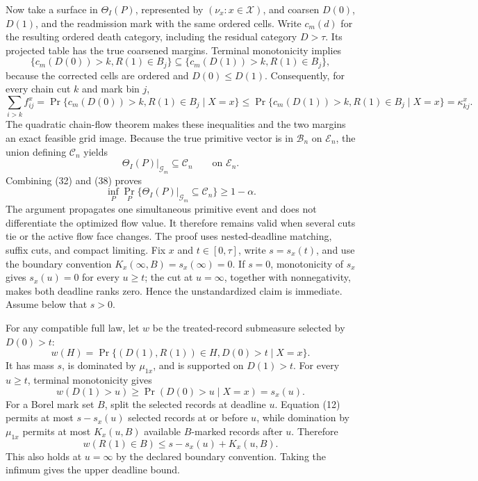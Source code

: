 Now take a surface in \(\Theta_I(P)\), represented by \((\nu_x:x\in\mathcal X)\), and coarsen \(D(0)\), \(D(1)\), and the readmission mark with the same ordered cells.  Write \(c_m(d)\) for the resulting ordered death category, including the residual category \(D>\tau\).  Its projected table has the true coarsened margins.  Terminal monotonicity implies
\[
\{c_m(D(0))>k,R(1)\in B_j\}
\subseteq
\{c_m(D(1))>k,R(1)\in B_j\},
\]
because the corrected cells are ordered and \(D(0)\leq D(1)\).  Consequently, for every chain cut \(k\) and mark bin \(j\),
\[
\sum_{i>k}f^x_{ij}
=\Pr\{c_m(D(0))>k,R(1)\in B_j\mid X=x\}
\leq\Pr\{c_m(D(1))>k,R(1)\in B_j\mid X=x\}
=\kappa^x_{kj}.                                                       \tag{37}
\]
The quadratic chain-flow theorem makes these inequalities and the two margins an exact feasible grid image.  Because the true primitive vector is in \(\mathcal B_n\) on \(\mathscr E_n\), the union defining \(\mathcal C_n\) yields
\[
\Theta_I(P)|_{\mathcal G_m}\subseteq\mathcal C_n
\qquad\text{on }\mathscr E_n.                                      \tag{38}
\]
Combining (32) and (38) proves
\[
\inf_P\Pr_P\{\Theta_I(P)|_{\mathcal G_m}\subseteq\mathcal C_n\}
\geq1-\alpha.
\]
The argument propagates one simultaneous primitive event and does not differentiate the optimized flow value.  It therefore remains valid when several cuts tie or the active flow face changes.
The proof uses nested-deadline matching, suffix cuts, and compact limiting.  Fix \(x\) and \(t\in[0,\tau]\), write \(s=s_x(t)\), and use the boundary convention \(K_x(\infty,B)=s_x(\infty)=0\).  If \(s=0\), monotonicity of \(s_x\) gives \(s_x(u)=0\) for every \(u\geq t\); the cut at \(u=\infty\), together with nonnegativity, makes both deadline ranks zero.  Hence the unstandardized claim is immediate.  Assume below that \(s>0\).

For any compatible full law, let \(w\) be the treated-record submeasure selected by \(D(0)>t\):
\[
w(H)=\Pr\{(D(1),R(1))\in H,D(0)>t\mid X=x\}.
\]
It has mass \(s\), is dominated by \(\mu_{1x}\), and is supported on \(D(1)>t\).  For every \(u\geq t\), terminal monotonicity gives
\[
w(D(1)>u)\geq\Pr(D(0)>u\mid X=x)=s_x(u).                             \tag{12}
\]
For a Borel mark set \(B\), split the selected records at deadline \(u\).  Equation (12) permits at most \(s-s_x(u)\) selected records at or before \(u\), while domination by \(\mu_{1x}\) permits at most \(K_x(u,B)\) available \(B\)-marked records after \(u\).  Therefore
\[
w(R(1)\in B)\leq s-s_x(u)+K_x(u,B).
\]
This also holds at \(u=\infty\) by the declared boundary convention.  Taking the infimum gives the upper deadline bound.

